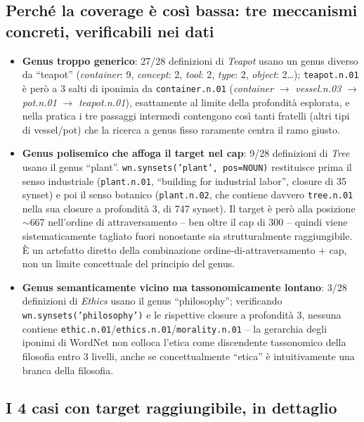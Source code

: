 \documentclass[12pt,a4paper]{article}
\begin{document}
\subsection{Perch\'e la coverage \`e cos\`i bassa: tre meccanismi concreti, verificabili nei dati}

\begin{itemize}
  \item \textbf{Genus troppo generico}: 27/28 definizioni di \textit{Teapot} usano un genus diverso da ``teapot'' (\textit{container}: 9, \textit{concept}: 2, \textit{tool}: 2, \textit{type}: 2, \textit{object}: 2\ldots); \texttt{teapot.n.01} \`e per\`o a 3 salti di iponimia da \texttt{container.n.01} (\textit{container} $\to$ \textit{vessel.n.03} $\to$ \textit{pot.n.01} $\to$ \textit{teapot.n.01}), esattamente al limite della profondit\`a esplorata, e nella pratica i tre passaggi intermedi contengono cos\`i tanti fratelli (altri tipi di vessel/pot) che la ricerca a genus fisso raramente centra il ramo giusto.
  \item \textbf{Genus polisemico che affoga il target nel cap}: 9/28 definizioni di \textit{Tree} usano il genus ``plant''. \texttt{wn.synsets('plant', pos=NOUN)} restituisce prima il senso industriale (\texttt{plant.n.01}, ``building for industrial labor'', closure di 35 synset) e poi il senso botanico (\texttt{plant.n.02}, che contiene davvero \texttt{tree.n.01} nella sua closure a profondit\`a 3, di 747 synset). Il target \`e per\`o alla posizione $\sim$667 nell'ordine di attraversamento -- ben oltre il cap di 300 -- quindi viene sistematicamente tagliato fuori nonostante sia strutturalmente raggiungibile. \`E un artefatto diretto della combinazione ordine-di-attraversamento + cap, non un limite concettuale del principio del genus.
  \item \textbf{Genus semanticamente vicino ma tassonomicamente lontano}: 3/28 definizioni di \textit{Ethics} usano il genus ``philosophy''; verificando \texttt{wn.synsets('philosophy')} e le rispettive closure a profondit\`a 3, nessuna contiene \texttt{ethic.n.01}/\texttt{ethics.n.01}/\texttt{morality.n.01} -- la gerarchia degli iponimi di WordNet non colloca l'etica come discendente tassonomico della filosofia entro 3 livelli, anche se concettualmente ``etica'' \`e intuitivamente una branca della filosofia.
\end{itemize}

\subsection{I 4 casi con target raggiungibile, in dettaglio}
\end{document}
